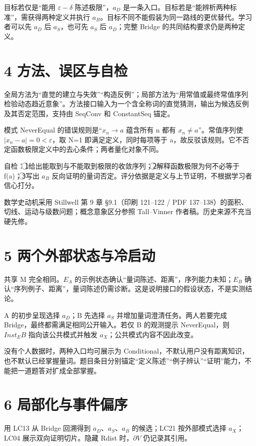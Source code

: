 \documentclass[UTF8,a4paper,zihao=-4,fontset=windows,openany]{ctexbook}
\newcommand{\mcsnum}[1]{\textcircled{\scriptsize #1}}
\def\mathrm#1{#1}%
\begin{document}
目标若仅是“能用 \(\varepsilon-\delta\) 陈述极限”，\(a_D\) 是一条入口。目标若是“能辨析两种标准”，需获得两种定义并执行 \(a_B\)。目标不同不能假装为同一路线的更优替代。学习者可以先 \(a_D\) 后 \(a_S\)，也可先 \(a_S\) 后 \(a_D\)；完整 Bridge 的共同结构要求仍是两种定义。

\section{4 方法、误区与自检}
全局方法为“直觉的建立与失效”“构造反例”；局部方法为“用常值或最终常值序列检验动态趋近意象”。方法接口输入为一个含全称词的直觉猜测，输出为候选反例及其否定范围，支持由 SeqConv 和 ConstantSeq 锚定。

模式 NeverEqual 的错误规则是\(“x_n\to a\) 蕴含所有 n 都有 \(x_n\ne a”\)。常值序列使 \(|x_n-a|=0<\varepsilon\)，取 N=1 即满足定义，同时每项等于 a，故反驳该规则。它不否定函数极限定义中的去心条件；两者量化对象不同。

自检：\mcsnum{1}给出能取到与不能取到极限的收敛序列；\mcsnum{2}解释函数极限为何不必等于 f(a)；\mcsnum{3}写出 \(a_B\) 反向证明的量词否定。评分依据是定义与上节证明，不根据学习者信心打分。

数学史动机采用 Stillwell 第 9 章 §9.1（印刷 121–122 / PDF 137–138）的面积、切线、运动与级数问题；概念意象区分参照 Tall–Vinner 作者稿。历史来源不充当硬先修。

\section{5 两个外部状态与冷启动}
共享 M 完全相同。\(E_A\) 的示例状态确认“量词陈述、距离”，序列能力未知；\(E_B\) 确认“序列例子、距离”，量词陈述仍需诊断。这是说明接口的假设状态，不是实测结论。

A 的初步呈现选择 \(a_D\)；B 先选择 \(a_S\) 并增加量词澄清任务。两人若要完成 Bridge，最终都需满足相同公开输入。若仅 B 的观测提示 NeverEqual，则 \(\mathrm{Inst}_\mathrm{EB}\) 指向该公共模式并触发 \(a_X\)；公共模式内容不因此改变。

没有个人数据时，两种入口均可展示为 Conditional，不默认用户没有距离知识，也不默认已经掌握量词。题目条目分别锚定“定义陈述”“例子辨认”“证明”能力，不能把一道题答对扩成全部掌握。

\section{6 局部化与事件偏序}
用 LC13 从 Bridge 回溯得到 \(a_D\)、\(a_S\)、\(a_B\) 的候选；LC21 按外部模式选择 \(a_X\)；LC04 展示双向证明切片。隐藏 Rdist 时，\(\partial V\) 仍记录其引用。
\end{document}
